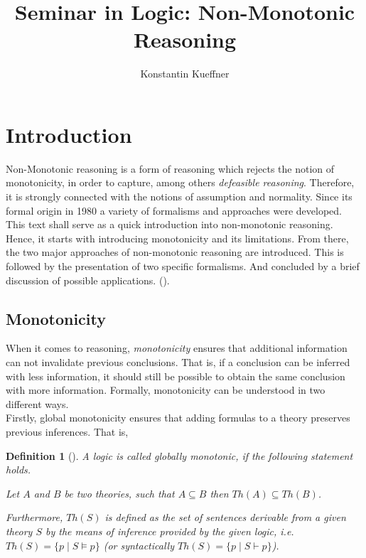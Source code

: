 \documentclass{extarticle}
\title{Seminar in Logic: Non-Monotonic Reasoning}
\author{Konstantin Kueffner}
\date{}
\newtheorem{mydef}[thm]{Definition}
\begin{document}
\maketitle

\section{Introduction}
Non-Monotonic reasoning is a form of reasoning which rejects the notion of monotonicity, in order to capture, among others \emph{defeasible reasoning}. Therefore, it is strongly connected with the notions of assumption and normality. Since its formal origin in 1980 a variety of formalisms and approaches were developed. This text shall serve as a quick introduction into non-monotonic reasoning. Hence, it starts with introducing monotonicity and its limitations. From there, the two major approaches of non-monotonic reasoning are introduced. This is followed by the presentation of two specific formalisms. And concluded
by a brief discussion of possible applications. (\cite{BOCHMAN2007557}). 

\subsection{Monotonicity}
\label{subsec:mono}
When it comes to reasoning, \emph{monotonicity} ensures that additional information can not invalidate previous conclusions. That is, if a conclusion can be inferred with less information, it should still be possible to obtain the same conclusion with more information. Formally, monotonicity can be understood in two different ways.\\ 

Firstly, global monotonicity ensures that adding formulas to a theory preserves previous inferences. That is,

\begin{mydef}[\cite{mcdermott1980non, mccarthy1981circumscription}]
    A logic is called globally monotonic, if the following statement holds.
    \begin{center}
        Let $A$ and $B$ be two theories, such that $A \subseteq B$
        then $Th(A) \subseteq Th(B)$.
    \end{center}
    Furthermore, $Th(S)$ is defined as the set of sentences
    derivable from a given theory $S$ by the means of inference provided by the given logic, i.e.  $Th(S)=\{p \mid S \models p \}$ (or syntactically $Th(S)=\{p \mid S \vdash p \}$).
\end{mydef}
\end{document}
